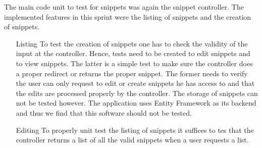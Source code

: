 \documentclass[10pt,a4paper,BCOR12mm, headexclude, footexclude,
  twoside, openright]{scrartcl}
\numberwithin{equation}{section} %
\numberwithin{figure}{section} %
\numberwithin{table}{section} %
\begin{document}
The main code unit to test for snippets was again the snippet controller. The
implemented features in this sprint were the listing of snippets and the
creation of snippets.

\begin{itemize}

\item[Listing] To test the creation of snippets one has to check the validity of the
  input at the controller. Hence, tests need to be created to edit snippets and
  to view snippets. The latter is a simple test to make sure the controller does
  a proper redirect or returns the proper snippet. The former needs to verify
  the user can only request to edit or create snippets he has access to and that
  the edits are processed properly by the controller. The storage of snippets
  can not be tested however. The application uses Entity Framework as its
  backend and thus we find that this software should not be tested.

\item[Editing] To properly unit test the listing of snippets it suffices to tes
  that the controller returns a list of all the valid snippets when a user
  requests a list.

\end{itemize}
\end{document}
